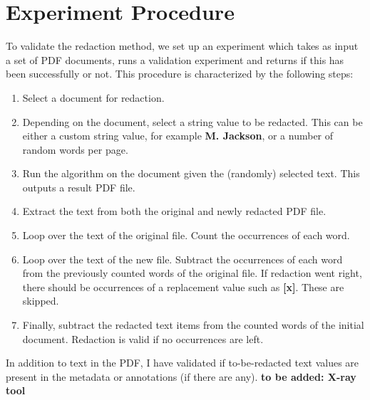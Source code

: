 \section{Experiment Procedure}
To validate the redaction method, we set up an experiment which takes as input a set of PDF documents, runs a validation experiment and returns if this has been successfully or not. This procedure is characterized by the following steps:
\begin{enumerate}
    \item Select a document for redaction.
    \item Depending on the document, select a string value to be redacted. This can be either a custom string value, for example \textbf{M. Jackson}, or a number of random words per page. 
    \item Run the algorithm on the document given the (randomly) selected text. This outputs a result PDF file.
    \item Extract the text from both the original and newly redacted PDF file.
    \item Loop over the text of the original file. Count the occurrences of each word.
    \item Loop over the text of the new file. Subtract the occurrences of each word from the previously counted words of the original file. If redaction went right, there should be occurrences of a replacement value such as \textbf{[x]}. These are skipped.
    \item Finally, subtract the redacted text items from the counted words of the initial document. Redaction is valid if no occurrences are left.
\end{enumerate}

In addition to text in the PDF, I have validated if to-be-redacted text values are present in the metadata or annotations (if there are any). \textbf{to be added: X-ray tool}

